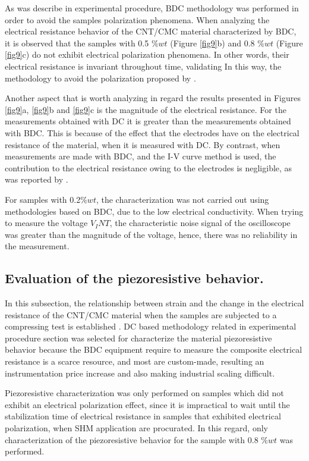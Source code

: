 \documentclass[twocolumn]{bmcart}%
\begin{document}
As was describe in experimental procedure, BDC methodology was performed in order to avoid the samples polarization phenomena. When analyzing the electrical resistance behavior of the CNT/CMC material characterized by BDC, it is observed that the samples with 0.5 $\%wt$ (Figure \ref{fig9}b) and 0.8 $\%wt$ (Figure \ref{fig9}c) do not exhibit electrical polarization phenomena. In other words, their electrical resistance is invariant throughout time, validating In this way, the methodology  to avoid the polarization proposed by  \cite{Downey2017a, DAlessandro2017}.

Another aspect that is worth analyzing in regard the results presented in Figures \ref{fig9}a, \ref{fig9}b and \ref{fig9}c is the magnitude of the electrical resistance. For the measurements obtained with DC it is greater than the measurements obtained with BDC. This is because of the effect that the electrodes have on the electrical resistance of the material, when it is measured with DC. By contrast, when measurements are made with BDC, and the I-V curve method is used, the contribution to the electrical resistance owing to the electrodes is negligible, as was reported by  \cite{Konsta-Gdoutos2014}.

For samples with 0.2$\%wt$, the characterization was not carried out using methodologies based on BDC, due to the low electrical conductivity. When trying to measure the voltage $V_INT$, the characteristic noise signal of the oscilloscope was greater than the magnitude of the voltage, hence, there was no reliability in the measurement. 

\subsection{Evaluation of the piezoresistive behavior.}

In this subsection, the relationship between strain and the change in the electrical resistance of the CNT/CMC material when the samples are subjected to a compressing test is established . DC based methodology related in experimental procedure section  was selected for characterize the material piezoresistive behavior because the BDC equipment require to measure the composite electrical resistance is a scarce resource, and most are custom-made, resulting an instrumentation price increase and also making industrial scaling difficult.

Piezoresistive characterization was only performed on samples which did not exhibit an electrical polarization effect, since it is impractical to wait until the stabilization time of electrical resistance in samples that exhibited electrical polarization, when SHM application are procurated. In this regard, only characterization of the piezoresistive behavior for the sample with 0.8 $\%wt$ was performed.
\end{document}
